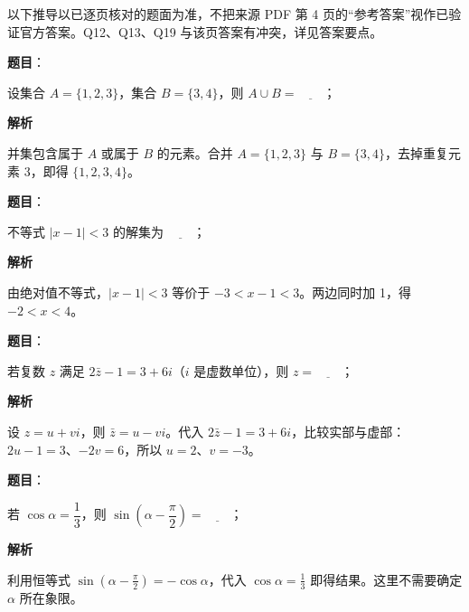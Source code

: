 

\begin{gktip}
以下推导以已逐页核对的题面为准，不把来源 PDF 第 4 页的“参考答案”视作已验证官方答案。Q12、Q13、Q19 与该页答案有冲突，详见答案要点。
\end{gktip}

\begin{answer}

\textbf{题目}：

设集合 $A=\{1,2,3\}$，集合 $B=\{3,4\}$，则 $A\cup B=\underline{\qquad}$；

\textbf{解析}

并集包含属于 $A$ 或属于 $B$ 的元素。合并 $A=\{1,2,3\}$ 与 $B=\{3,4\}$，去掉重复元素 3，即得 $\{1,2,3,4\}$。


\end{answer}
\begin{answer}

\textbf{题目}：

不等式 $|x-1|<3$ 的解集为 $\underline{\qquad}$；

\textbf{解析}

由绝对值不等式，$|x-1|<3$ 等价于 $-3<x-1<3$。两边同时加 1，得 $-2<x<4$。


\end{answer}
\begin{answer}

\textbf{题目}：

若复数 $z$ 满足 $2\bar z-1=3+6i$（$i$ 是虚数单位），则 $z=\underline{\qquad}$；

\textbf{解析}

设 $z=u+vi$，则 $\bar z=u-vi$。代入 $2\bar z-1=3+6i$，比较实部与虚部：$2u-1=3$、$-2v=6$，所以 $u=2$、$v=-3$。


\end{answer}
\begin{answer}

\textbf{题目}：

若 $\cos\alpha=\dfrac13$，则 $\sin\left(\alpha-\dfrac\pi2\right)=\underline{\qquad}$；

\textbf{解析}

利用恒等式 $\sin(\alpha-\frac\pi2)=-\cos\alpha$，代入 $\cos\alpha=\frac13$ 即得结果。这里不需要确定 $\alpha$ 所在象限。


\end{answer}
